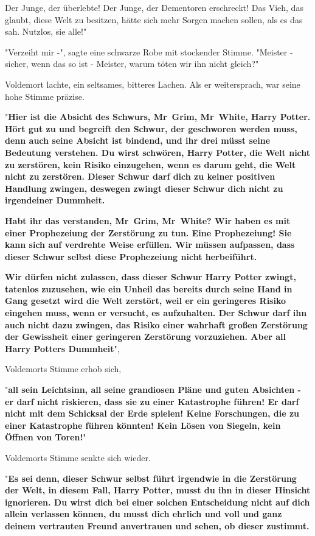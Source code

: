 {{Der Junge, der überlebte! Der Junge, der Dementoren erschreckt! Das Vieh, das glaubt, diese Welt zu besitzen, hätte sich mehr Sorgen machen sollen, als es das sah. Nutzlos, sie alle!}"

"Verzeiht mir -", sagte eine schwarze Robe mit stockender Stimme. "Meister - sicher, wenn das so ist - Meister, warum töten wir ihn nicht gleich?"

Voldemort lachte, ein seltsames, bitteres Lachen. Als er weitersprach, war seine hohe Stimme präzise.

"\textbf{Hier ist die Absicht des Schwurs, Mr~Grim, Mr~White, Harry Potter. Hört gut zu und begreift den Schwur, der geschworen werden muss, denn auch seine Absicht ist bindend, und ihr drei müsst seine Bedeutung verstehen. Du wirst schwören, Harry Potter, die Welt nicht zu zerstören, kein Risiko einzugehen, wenn es darum geht, die Welt nicht zu zerstören. Dieser Schwur darf dich zu keiner positiven Handlung zwingen, deswegen zwingt dieser Schwur dich nicht zu irgendeiner Dummheit.}

\textbf{Habt ihr das verstanden, Mr~Grim, Mr~White? Wir haben es mit einer Prophezeiung der Zerstörung zu tun. Eine Prophezeiung! Sie kann sich auf verdrehte Weise erfüllen. Wir müssen aufpassen, dass dieser Schwur selbst diese Prophezeiung nicht herbeiführt.}

\textbf{Wir dürfen nicht zulassen, dass dieser Schwur Harry Potter zwingt, tatenlos} \textbf{zuzusehen, wie ein Unheil das bereits durch seine Hand in Gang gesetzt wird die Welt zerstört, weil er ein geringeres Risiko eingehen muss, wenn er versucht, es aufzuhalten. Der Schwur darf ihn auch nicht dazu zwingen, das Risiko einer wahrhaft großen Zerstörung der Gewissheit einer geringeren Zerstörung vorzuziehen. Aber all Harry Potters Dummheit}",

Voldemorts Stimme erhob sich,

"\textbf{all sein Leichtsinn, all seine grandiosen Pläne und guten Absichten - er darf nicht riskieren, dass sie zu einer Katastrophe führen! Er darf nicht mit dem Schicksal der Erde spielen! Keine Forschungen, die zu einer Katastrophe führen könnten! Kein Lösen von Siegeln, kein Öffnen von Toren!}"

Voldemorts Stimme senkte sich wieder.

"\textbf{Es sei denn, dieser Schwur selbst führt irgendwie in die Zerstörung der Welt, in diesem Fall, Harry Potter, musst du ihn in dieser Hinsicht ignorieren. Du wirst dich bei einer solchen Entscheidung nicht auf dich allein verlassen können, du musst dich ehrlich und voll und ganz deinem vertrauten Freund anvertrauen und sehen, ob dieser zustimmt.}

}
